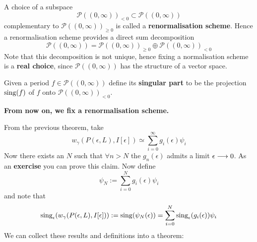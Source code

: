 \begin{definition}
  A choice of a subspace
  \begin{equation}\mathcal{P}((0,\infty))_{< 0} \subset \mathcal{P}((0,\infty)) \end{equation}
  complementary to $\mathcal{P}((0,\infty))_{\geq 0}$ is called a \textbf{renormalisation scheme}. Hence a renormalisation scheme provides a direct sum decomposition
  \begin{equation}\mathcal{P}((0,\infty)) = \mathcal{P}((0,\infty))_{\geq 0} \oplus \mathcal{P}((0,\infty))_{< 0}\end{equation}
  Note that this decomposition is not unique, hence fixing a normalisation scheme is a \textbf{real choice}, since $\mathcal{P}((0,\infty))$ has the structure of a vector space.
\end{definition}

\begin{definition}
  Given a period $f \in \mathcal{P}((0,\infty))$ define its \textbf{singular part} to be the projection $\operatorname{sing}(f)$ of $f$ onto $\mathcal{P}((0,\infty))_{< 0}$.
\end{definition}

\begin{mdframed}
\centering
  \textbf{From now on, we fix a renormalisation scheme.}
\end{mdframed}

From the previous theorem, take
\begin{equation} w_\gamma (P(\epsilon,L), I[\epsilon]) \simeq \sum_{i=0}^{\infty} g_i(\epsilon) \psi_i\end{equation}
Now there exists an $N$ such that $\forall n > N$ the $g_n(\epsilon)$ admits a limit $\epsilon \lra 0$. As an \textbf{exercise} you can prove this claim. Now define
\begin{equation} \psi_N := \sum_{i=0}^N g_i(\epsilon) \psi_i\end{equation}
and note that
\begin{equation} \sing_\epsilon (w_\gamma(P(\epsilon,L), I[\epsilon])) := \sing( \psi_N(\epsilon)) = \sum_{i=0}^N \sing_\epsilon(g_i(\epsilon)) \psi_i\end{equation}
We can collect these results and definitions into a theorem:

